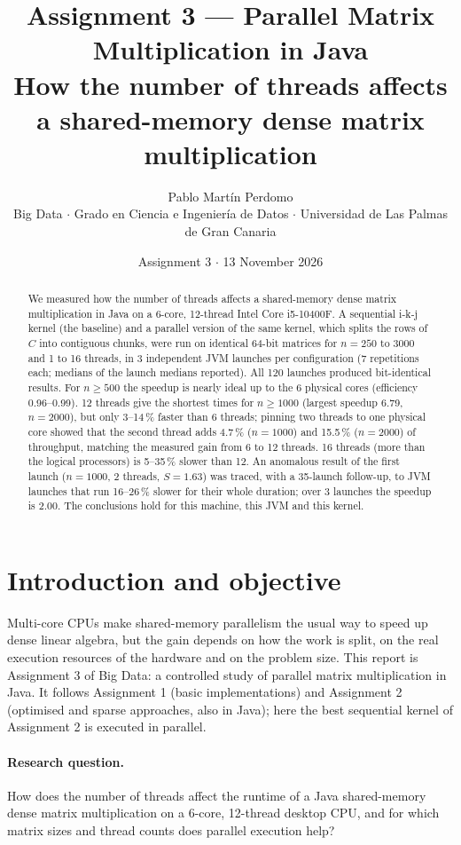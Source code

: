 \documentclass[11pt,a4paper]{article}
\title{\textbf{Assignment 3 --- Parallel Matrix Multiplication in Java}\\[4pt]
\large How the number of threads affects a shared-memory dense matrix multiplication}
\author{Pablo Martín Perdomo\\[2pt]
\small Big Data $\cdot$ Grado en Ciencia e Ingeniería de Datos $\cdot$ Universidad de Las Palmas de Gran Canaria}
\date{Assignment 3 $\cdot$ 13 November 2026}
\begin{document}
\sloppy
\maketitle

\begin{abstract}
\noindent We measured how the number of threads affects a shared-memory dense matrix multiplication in Java on a 6-core, 12-thread Intel Core i5-10400F. A sequential i-k-j kernel (the baseline) and a parallel version of the same kernel, which splits the rows of $C$ into contiguous chunks, were run on identical 64-bit matrices for $n = 250$ to $3000$ and 1 to 16 threads, in 3 independent JVM launches per configuration (7 repetitions each; medians of the launch medians reported). All 120 launches produced bit-identical results. For $n \ge 500$ the speedup is nearly ideal up to the 6 physical cores (efficiency 0.96--0.99). 12 threads give the shortest times for $n \ge 1000$ (largest speedup 6.79, $n = 2000$), but only 3--14\,\% faster than 6 threads; pinning two threads to one physical core showed that the second thread adds 4.7\,\% ($n = 1000$) and 15.5\,\% ($n = 2000$) of throughput, matching the measured gain from 6 to 12 threads. 16 threads (more than the logical processors) is 5--35\,\% slower than 12. An anomalous result of the first launch ($n = 1000$, 2 threads, $S = 1.63$) was traced, with a 35-launch follow-up, to JVM launches that run 16--26\,\% slower for their whole duration; over 3 launches the speedup is 2.00. The conclusions hold for this machine, this JVM and this kernel.
\end{abstract}

\section{Introduction and objective}

Multi-core CPUs make shared-memory parallelism the usual way to speed up dense linear algebra, but the gain depends on how the work is split, on the real execution resources of the hardware and on the problem size. This report is Assignment 3 of Big Data: a controlled study of parallel matrix multiplication in Java. It follows Assignment 1 (basic implementations) and Assignment 2 (optimised and sparse approaches, also in Java); here the best sequential kernel of Assignment 2 is executed in parallel.

\paragraph{Research question.} How does the number of threads affect the runtime of a Java shared-memory dense matrix multiplication on a 6-core, 12-thread desktop CPU, and for which matrix sizes and thread counts does parallel execution help?
\end{document}
